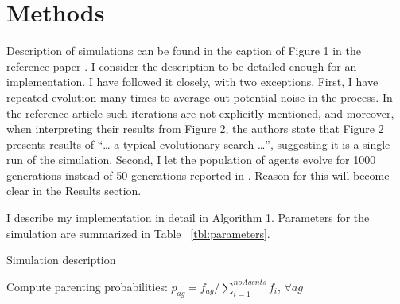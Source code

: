 \documentclass[10pt,a4paper,onecolumn]{article}
\begin{document}
\section{Methods}\label{methods}

Description of simulations can be found in the caption of Figure 1 in
the reference paper \autocite{hinton1987learning}. I consider the
description to be detailed enough for an implementation. I have followed
it closely, with two exceptions. First, I have repeated evolution many
times to average out potential noise in the process. In the reference
article such iterations are not explicitly mentioned, and moreover, when
interpreting their results from Figure 2, the authors state that Figure
2 presents results of ``\ldots{} a typical evolutionary search
\ldots{}'', suggesting it is a single run of the simulation. Second, I
let the population of agents evolve for 1000 generations instead of 50
generations reported in \textcite{hinton1987learning}. Reason for this
will become clear in the Results section.

I describe my implementation in detail in Algorithm 1. Parameters for
the simulation are summarized in Table ~\ref{tbl:parameters}.

\begin{algorithm}
\caption{Simulation description}
    \begin{algorithmic}[1]
             
                      \EndIf
                \EndFor
            \EndFor
            \State Compute parenting probabilities: 
            \State $p_{ag}=f_{ag}/\sum_{i=1}^{noAgents}f_{i}$, $\forall ag$
             
            \EndFor
        \EndFor
    \EndFor
    \end{algorithmic}
\end{algorithm}
\end{document}

